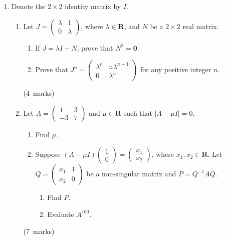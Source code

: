 \documentclass[12pt, a4paper]{article} %
\newcommand{\qmarks}[1]{\leavevmode\unskip\hspace*{\fill}\mbox{(#1 marks)}}
\begin{document}
\begin{enumerate}
    \item Denote the \(2\times2\) identity matrix by \(I\).
    \begin{enumerate}
        \item Let \(J=\begin{pmatrix}
            \lambda&1\\0&\lambda
        \end{pmatrix}\), where \(\lambda\in\mathbf{R}\), and \(N\) be a \(2\times2\) real matrix.
        \begin{enumerate}[label=(\roman*)]
            \item If \(J=\lambda I+N\), prove that \(N^2=\mathbf{0}\).
            \item Prove that \(J^n=\begin{pmatrix}
                \lambda^n & n\lambda^{n-1}\\0&\lambda^n
            \end{pmatrix}\) for any positive integer \(n\).
        \end{enumerate}\qmarks{4}
        \item Let \(A=\begin{pmatrix}
            1&3\\-3&7
        \end{pmatrix}\) and \(\mu\in\mathbf{R}\) such that \(|A-\mu I|=0\).
        \begin{enumerate}[label=(\roman*)]
            \item Find \(\mu\).
            \item Suppose \((A-\mu I)\begin{pmatrix}1\\0\end{pmatrix}=\begin{pmatrix}x_1\\x_2\end{pmatrix}\), where \(x_1,x_2\in\mathbf{R}\). Let \(Q=\begin{pmatrix}
                x_1&1\\x_2&0
            \end{pmatrix}\) be a non-singular matrix and \(P=Q^{-1}AQ\).
            \begin{enumerate}[label=(\arabic*)]
                \item Find \(P\).
                \item Evaluate \(A^100\).
            \end{enumerate}
        \end{enumerate}\qmarks{7}
    \end{enumerate}


\end{enumerate}
\end{document}
